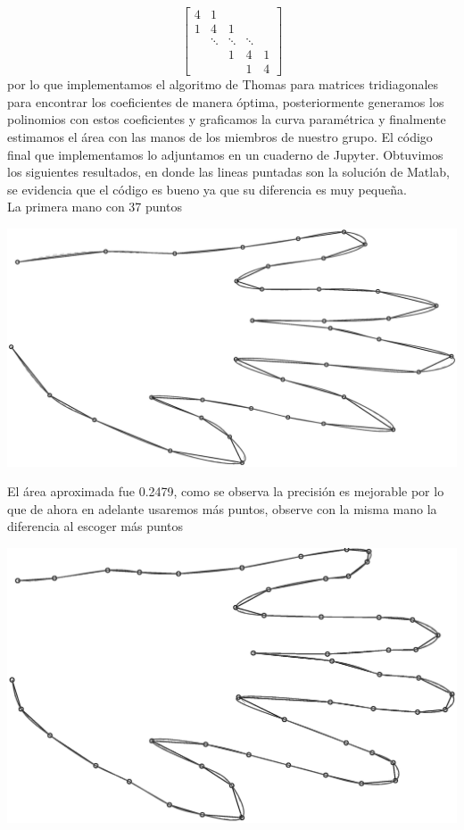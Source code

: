 \begin{solution}
$$\left[\begin{array}{ccccc}
4 & 1 & & & \\
1 & 4 & 1 & & \\
& \ddots & \ddots & \ddots & \\
& & 1 & 4 & 1 \\
& & & 1 & 4
\end{array}\right]$$
por lo que implementamos el algoritmo de Thomas para matrices tridiagonales para encontrar los coeficientes de manera óptima, posteriormente generamos los polinomios con estos coeficientes y graficamos la curva  paramétrica y finalmente estimamos el área con las manos de los miembros de nuestro grupo. El código final que implementamos lo adjuntamos en un cuaderno de Jupyter. Obtuvimos los siguientes resultados, en donde las lineas puntadas son la solución de Matlab, se evidencia que el código es bueno ya que su diferencia es muy pequeña.\\

La primera mano con 37 puntos
\begin{center}
    \includegraphics[scale=0.25]{Graficas/Mano1.eps}
\end{center}
El área aproximada fue 0.2479, como se observa la precisión es mejorable por lo que de ahora en adelante usaremos más puntos, observe con la misma mano la diferencia al escoger más puntos

\begin{center}
    \includegraphics[scale=0.25]{Graficas/Mano1++.eps}
\end{center}


\end{solution}
